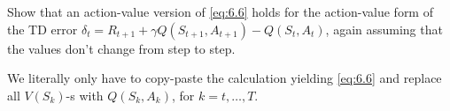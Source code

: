 
\begin{exercise}[Exercise 6.8]

Show that an action-value version of \eqref{eq:6.6} holds for the action-value form of the TD error $\delta_t = R_{t+1} + \gamma Q(S_{t+1}, A_{t+1}) - Q(S_t, A_t)$, again assuming that the values don't change from step to step.

\end{exercise}


\begin{solution}

We literally only have to copy-paste the calculation yielding \eqref{eq:6.6} and replace all $V(S_k)$-s with $Q(S_k, A_k)$, for $k = t, \dots, T$.

\end{solution}


